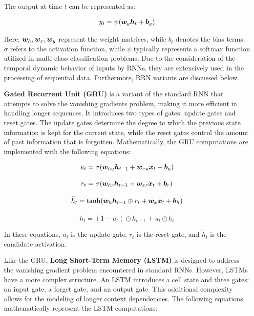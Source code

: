 The output at time $t$ can be represented as:

\begin{equation}
y_t = \psi(\bm {w}_{y}\bm {h}_t + \bm {b}_y)
\end{equation}

Here, $\bm {w}_{h}, \bm {w}_{x}, \bm {w}_{y}$ represent the weight matrices, while $b_t$ denotes the bias terms. $\sigma$ refers to the activation function, while $\psi$ typically represents a softmax function utilized in multi-class classification problems. Due to the consideration of the temporal dynamic behavior of inputs by RNNs, they are extensively used in the processing of sequential data. Furthermore, RRN variants are discussed  below.

\textbf{Gated Recurrent Unit (GRU)} is a variant of the standard RNN that attempts to solve the vanishing gradients problem, making it more efficient in handling longer sequences. It introduces two types of gates: update gates and reset gates. The update gates determine the degree to which the previous state information is kept for the current state, while the reset gates control the amount of past information that is forgotten. Mathematically, the GRU computations are implemented with the following equations:

\begin{equation}
u_t = \sigma(\bm {w}_{hu}\bm {h}_{t-1} + \bm {w}_{xu}\bm {x}_t + \bm {b}_u)
\end{equation}

\begin{equation}
r_t = \sigma(\bm {w}_{hr}\bm {h}_{t-1} + \bm {w}_{xr}\bm {x}_t + \bm {b}_r)
\end{equation}

\begin{equation}
\widetilde{h}_t = \tanh(\bm {w}_{h}\bm {h}_{t-1}\odot r_t + \bm {w}_{x}\bm {x}_t + \bm {b}_h)
\end{equation}

\begin{equation}
h_t = (1 - u_t) \odot h_{t-1} + u_t \odot \widetilde{h}_t
\end{equation}

In these equations, $u_t$ is the update gate, $r_t$ is the reset gate, and $\widetilde{h}_t$ is the candidate activation.

Like the GRU, \textbf{Long Short-Term Memory (LSTM)} is designed to address the vanishing gradient problem encountered in standard RNNs. However, LSTMs have a more complex structure. An LSTM introduces a cell state and three gates: an input gate, a forget gate, and an output gate. This additional complexity allows for the modeling of longer context dependencies. The following equations mathematically represent the LSTM computations:

